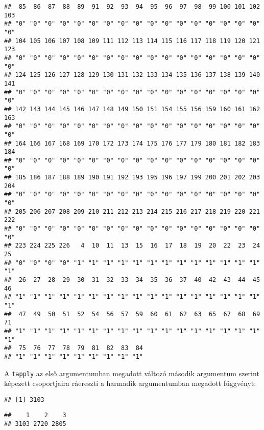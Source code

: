 \documentclass[]{book}
\newenvironment{Shaded}{\begin{snugshade}}{\end{snugshade}}
\newcommand{\KeywordTok}[1]{\textcolor[rgb]{0.13,0.29,0.53}{\textbf{#1}}}
\newcommand{\DecValTok}[1]{\textcolor[rgb]{0.00,0.00,0.81}{#1}}
\newcommand{\StringTok}[1]{\textcolor[rgb]{0.31,0.60,0.02}{#1}}
\newcommand{\OperatorTok}[1]{\textcolor[rgb]{0.81,0.36,0.00}{\textbf{#1}}}
\newcommand{\NormalTok}[1]{#1}
\begin{document}
\begin{verbatim}
##  85  86  87  88  89  91  92  93  94  95  96  97  98  99 100 101 102 103 
## "0" "0" "0" "0" "0" "0" "0" "0" "0" "0" "0" "0" "0" "0" "0" "0" "0" "0" 
## 104 105 106 107 108 109 111 112 113 114 115 116 117 118 119 120 121 123 
## "0" "0" "0" "0" "0" "0" "0" "0" "0" "0" "0" "0" "0" "0" "0" "0" "0" "0" 
## 124 125 126 127 128 129 130 131 132 133 134 135 136 137 138 139 140 141 
## "0" "0" "0" "0" "0" "0" "0" "0" "0" "0" "0" "0" "0" "0" "0" "0" "0" "0" 
## 142 143 144 145 146 147 148 149 150 151 154 155 156 159 160 161 162 163 
## "0" "0" "0" "0" "0" "0" "0" "0" "0" "0" "0" "0" "0" "0" "0" "0" "0" "0" 
## 164 166 167 168 169 170 172 173 174 175 176 177 179 180 181 182 183 184 
## "0" "0" "0" "0" "0" "0" "0" "0" "0" "0" "0" "0" "0" "0" "0" "0" "0" "0" 
## 185 186 187 188 189 190 191 192 193 195 196 197 199 200 201 202 203 204 
## "0" "0" "0" "0" "0" "0" "0" "0" "0" "0" "0" "0" "0" "0" "0" "0" "0" "0" 
## 205 206 207 208 209 210 211 212 213 214 215 216 217 218 219 220 221 222 
## "0" "0" "0" "0" "0" "0" "0" "0" "0" "0" "0" "0" "0" "0" "0" "0" "0" "0" 
## 223 224 225 226   4  10  11  13  15  16  17  18  19  20  22  23  24  25 
## "0" "0" "0" "0" "1" "1" "1" "1" "1" "1" "1" "1" "1" "1" "1" "1" "1" "1" 
##  26  27  28  29  30  31  32  33  34  35  36  37  40  42  43  44  45  46 
## "1" "1" "1" "1" "1" "1" "1" "1" "1" "1" "1" "1" "1" "1" "1" "1" "1" "1" 
##  47  49  50  51  52  54  56  57  59  60  61  62  63  65  67  68  69  71 
## "1" "1" "1" "1" "1" "1" "1" "1" "1" "1" "1" "1" "1" "1" "1" "1" "1" "1" 
##  75  76  77  78  79  81  82  83  84 
## "1" "1" "1" "1" "1" "1" "1" "1" "1"
\end{verbatim}

A \texttt{tapply} az első argumentumban megadott változó második
argumentum szerint képezett csoportjaira ráereszti a harmadik
argumentumban megadott függvényt:

\begin{Shaded}
\end{Shaded}

\begin{verbatim}
## [1] 3103
\end{verbatim}

\begin{Shaded}
\end{Shaded}

\begin{verbatim}
##    1    2    3 
## 3103 2720 2805
\end{verbatim}
\end{document}
